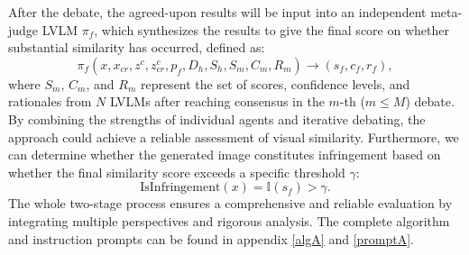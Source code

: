 After the debate, the agreed-upon results will be input into an independent meta-judge LVLM $\pi_{f}$, which synthesizes the results to give the final score on whether substantial similarity has occurred, defined as: 
\begin{equation}
\pi_{f}(x, x_{{cr}}, z^c, z^c_{cr}, p_{f}, D_h, S_h, S_m, C_m, R_m) \to (s_{f}, c_{f}, r_{f}),
\end{equation}
where $S_m$, $C_m$, and $R_m$ represent the set of scores, confidence levels, and rationales from $N$ LVLMs after reaching consensus in the $m$-th ($m \leq M$) debate. By combining the strengths of individual agents and iterative debating, the approach could achieve a reliable assessment of visual similarity.
Furthermore, we can determine whether the generated image constitutes infringement based on whether the final similarity score exceeds a specific threshold $\gamma$:
\begin{equation}
\text{IsInfringement}(x) = \mathbb{I}(s_{f}) > \gamma.
\end{equation}
The whole two-stage process ensures a comprehensive and reliable evaluation by integrating multiple perspectives and rigorous analysis. The complete algorithm and instruction prompts can be found in appendix \ref{algA} and \ref{promptA}.




